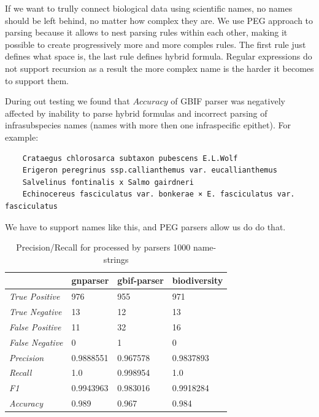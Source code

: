 \documentclass{bmcart}
\begin{document}
If we want to trully connect biological data using scientific names, no names
should be left behind, no matter how complex they are. We use PEG approach to
parsing because it allows to nest parsing rules within each other, making it
possible to create progressively more and more comples rules. The first rule
just defines what space is, the last rule defines hybrid formula. Regular
expressions do not support recursion as a result the more complex name is the
harder it becomes to support them.

During out testing we found that $Accuracy$ of GBIF parser was negatively
affected by inability to parse hybrid formulas and incorrect parsing of
infrasubspecies names (names with more then one infraspecific epithet). For
example:

\begin{verbatim}
    Crataegus chlorosarca subtaxon pubescens E.L.Wolf
    Erigeron peregrinus ssp.callianthemus var. eucallianthemus
    Salvelinus fontinalis x Salmo gairdneri
    Echinocereus fasciculatus var. bonkerae × E. fasciculatus var. fasciculatus
\end{verbatim}

We have to support names like this, and PEG parsers allow us do do that.


\begin{table}[htb]
  \begin{center}
    \caption{Precision/Recall for processed by parsers 1000
    name-strings}\label{table:precision}
    \begin{tabular}{|l|*{3}{l}|}
      \hline
                             & gnparser & gbif-parser & biodiversity \\
      \hline
      \textit{True Positive} & 976      & 955         & 971          \\
      \textit{True Negative} & 13       & 12          & 13           \\
      \textit{False Positive}& 11       & 32          & 16           \\
      \textit{False Negative}& 0        & 1           & 0            \\
      \textit{Precision}     & 0.9888551& 0.967578    & 0.9837893    \\
      \textit{Recall}        & 1.0      & 0.998954    & 1.0          \\
      \textit{F1}            & 0.9943963& 0.983016    & 0.9918284    \\
      \textit{Accuracy}      & 0.989    & 0.967       & 0.984        \\
      \hline
    \end{tabular}
  \end{center}
\end{table}
\end{document}
